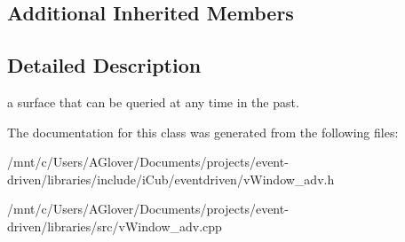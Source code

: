 \subsection*{Additional Inherited Members}


\subsection{Detailed Description}
a surface that can be queried at any time in the past. 

The documentation for this class was generated from the following files\+:\begin{DoxyCompactItemize}
\item 
/mnt/c/\+Users/\+A\+Glover/\+Documents/projects/event-\/driven/libraries/include/i\+Cub/eventdriven/v\+Window\+\_\+adv.\+h\item 
/mnt/c/\+Users/\+A\+Glover/\+Documents/projects/event-\/driven/libraries/src/v\+Window\+\_\+adv.\+cpp\end{DoxyCompactItemize}
